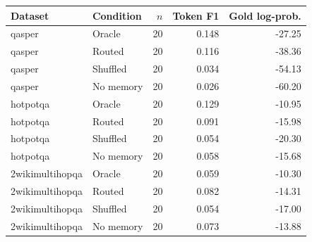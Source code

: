 \begin{tabular}{llrrr}
\toprule
Dataset & Condition & $n$ & Token F1 & Gold log-prob. \\
\midrule
qasper & Oracle & 20 & 0.148 & -27.25 \\
qasper & Routed & 20 & 0.116 & -38.36 \\
qasper & Shuffled & 20 & 0.034 & -54.13 \\
qasper & No memory & 20 & 0.026 & -60.20 \\
hotpotqa & Oracle & 20 & 0.129 & -10.95 \\
hotpotqa & Routed & 20 & 0.091 & -15.98 \\
hotpotqa & Shuffled & 20 & 0.054 & -20.30 \\
hotpotqa & No memory & 20 & 0.058 & -15.68 \\
2wikimultihopqa & Oracle & 20 & 0.059 & -10.30 \\
2wikimultihopqa & Routed & 20 & 0.082 & -14.31 \\
2wikimultihopqa & Shuffled & 20 & 0.054 & -17.00 \\
2wikimultihopqa & No memory & 20 & 0.073 & -13.88 \\
\bottomrule
\end{tabular}
